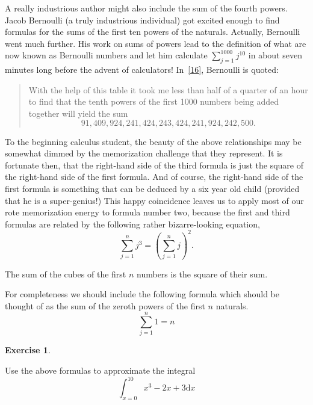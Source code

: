 \documentclass[10pt,]{book}
\theoremstyle{plain}
\theoremstyle{definition}
\theoremstyle{definition}
\newtheorem{exercise}[theorem]{Exercise}
\numberwithin{equation}{section}
\begin{document}
    A really industrious author might also include the sum of the
    fourth powers. Jacob Bernoulli (a truly industrious individual)
    got excited enough to find formulas for the sums of the first
    ten powers of the naturals. Actually, Bernoulli went much further. His work
    on sums of powers lead to the definition of what are now known as Bernoulli
    numbers and let him calculate \(\sum_{j=1}^{1000}j^{10}\) in
    about seven minutes \textemdash{} long before the advent of calculators! In~\hyperlink{struik}{[16]}, Bernoulli is
    quoted:
\begin{quote}
  With the help of this table it took me less than half of a quarter of an hour
  to find that the tenth powers of the first 1000 numbers being added together 
  will yield the sum
  \begin{equation*}
    91,409,924,241,424,243,424,241,924,242,500.
  \end{equation*}\end{quote}
\par

    To the beginning calculus student, the beauty of the above relationships may
    be somewhat dimmed by the memorization challenge that they represent. It
    is fortunate then, that the right-hand side of the third formula is just
    the square of the right-hand side of the first formula. And of course,
    the right-hand side of the first formula is something that can be deduced
    by a six year old child (provided that he is a super-genius!) This happy
    coincidence leaves us to apply most of our rote memorization energy to
    formula number two, because the first and third formulas are related by
    the following rather bizarre-looking equation,
    \begin{equation*}
      \sum_{j=1}^n j^3 = \left( \sum_{j=1}^n j \right)^2.
    \end{equation*}
\par

    The sum of the cubes of the first \(n\) numbers is the square of their sum.
\par

    For completeness we should include the following formula which
    should be thought of as the sum of the zeroth powers of the first \(n\)
    naturals.
    \begin{equation*}
      \sum_{j=1}^n 1 = n
    \end{equation*}
\begin{exercise}\label{exercise-43}

        Use the above formulas to approximate the integral
        \begin{equation*}
          \int_{x=0}^{10} x^3 - 2x +3 \mbox{d} x
        \end{equation*}
\end{exercise}
\par
\end{document}

